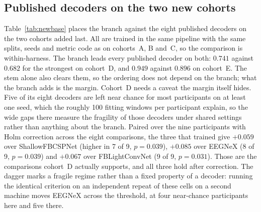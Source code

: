 \documentclass[a4paper,fleqn]{cas-dc}
\begin{document}
\subsection{Published decoders on the two new cohorts}
\label{sec:newbaselines}

Table~\ref{tab:newbase} places the branch against the eight published decoders on the two cohorts added last. All are trained in the same pipeline with the same splits, seeds and metric code as on cohorts~A, B and~C, so the comparison is within-harness. The branch leads every published decoder on both: $0.741$ against $0.682$ for the strongest on cohort~D, and $0.949$ against $0.896$ on cohort~E. The stem alone also clears them, so the ordering does not depend on the branch; what the branch adds is the margin. Cohort~D needs a caveat the margin itself hides. Five of its eight decoders are left near chance for most participants on at least one seed, which the roughly 100 fitting windows per participant explain, so the wide gaps there measure the fragility of those decoders under shared settings rather than anything about the branch. Paired over the nine participants with Holm correction across the eight comparisons, the three that trained give $+0.059$ over ShallowFBCSPNet (higher in 7 of 9, $p=0.039$), $+0.085$ over EEGNeX (8 of 9, $p=0.039$) and $+0.067$ over FBLightConvNet (9 of 9, $p=0.031$). Those are the comparisons cohort~D actually supports, and all three hold after correction. The dagger marks a fragile regime rather than a fixed property of a decoder: running the identical criterion on an independent repeat of these cells on a second machine moves EEGNeX across the threshold, at four near-chance participants here and five there.
\end{document}
